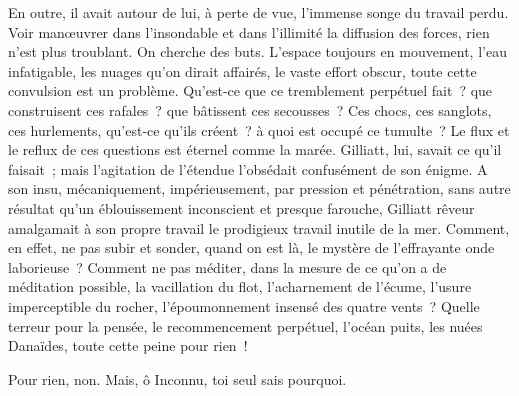 \documentclass[french,twoside]{book} %
\begin{document}
En outre, il avait autour de lui, à perte de vue,  l’immense songe du travail perdu. Voir manœuvrer dans l’insondable et dans l’illimité la diffusion des forces, rien n’est plus troublant. On cherche des buts. L’espace toujours en mouvement, l’eau infatigable, les nuages qu’on dirait affairés, le vaste effort obscur, toute cette convulsion est un problème. Qu’est-ce que ce tremblement perpétuel fait ? que construisent ces rafales ? que bâtissent ces secousses ? Ces chocs, ces sanglots, ces hurlements, qu’est-ce qu’ils créent ? à quoi est occupé ce tumulte ? Le flux et le reflux de ces questions est éternel comme la marée. Gilliatt, lui, savait ce qu’il faisait ; mais l’agitation de l’étendue l’obsédait confusément de son énigme. A son insu, mécaniquement, impérieusement, par pression et pénétration, sans autre résultat qu’un éblouissement inconscient et presque farouche, Gilliatt rêveur amalgamait à son propre travail le prodigieux travail inutile de la mer. Comment, en effet, ne pas subir et sonder, quand on est là, le mystère de l’effrayante onde laborieuse ? Comment ne pas méditer, dans la mesure de ce qu’on a de méditation possible, la vacillation du flot, l’acharnement de l’écume, l’usure imperceptible du rocher, l’époumonnement insensé des quatre vents ? Quelle terreur pour la pensée, le recommencement perpétuel, l’océan puits, les nuées Danaïdes, toute cette peine pour rien !\par
Pour rien, non. Mais, ô Inconnu, toi seul sais pourquoi.
\end{document}
